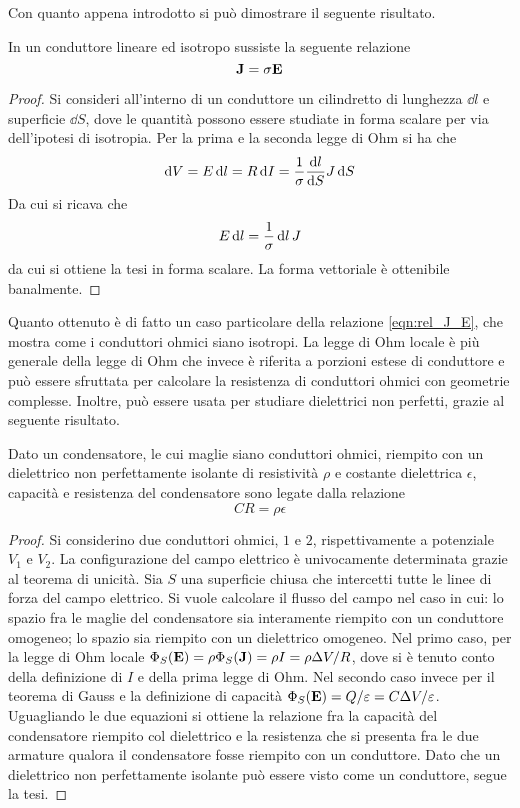 Con quanto appena introdotto si può dimostrare il seguente risultato.
\begin{thm}
    In un conduttore lineare ed isotropo sussiste la seguente relazione
    \begin{equation}
        \vb{J}=\sigma\vb{E}
    \end{equation}
\end{thm}
\begin{proof}
    Si consideri all'interno di un conduttore un cilindretto di lunghezza $\dd{l}$ e superficie $\dd{S}$,
    dove le quantità possono essere studiate in forma scalare per via dell'ipotesi di isotropia.
    Per la prima e la seconda legge di Ohm si ha che
    \[
        \dd{V}=E\dd{l}=R\dd{I}=\frac{1}{\sigma}\frac{\dd{l}}{\dd{S}}J\dd{S}
    \]
    Da cui si ricava che
    \[
        E\dd{l}=\frac{1}{\sigma}\dd{l}J
    \]
    da cui si ottiene la tesi in forma scalare. La forma vettoriale è ottenibile banalmente.
\end{proof}
Quanto ottenuto è di fatto un caso particolare della relazione \eqref{eqn:rel_J_E}, che mostra come
i conduttori ohmici siano isotropi. La legge di
Ohm locale è più generale della legge di Ohm che invece è riferita a porzioni estese di conduttore e può
essere sfruttata per calcolare la resistenza di conduttori ohmici con geometrie complesse.
Inoltre, può essere usata per studiare dielettrici non perfetti, grazie al seguente risultato.
\begin{cor}
    Dato un condensatore, le cui maglie siano conduttori ohmici, riempito con un dielettrico
    non perfettamente isolante di resistività $\rho$ e costante dielettrica $\epsilon$,
    capacità e resistenza del condensatore sono legate dalla relazione
    \[
        CR=\rho\epsilon
    \]
\end{cor}
\begin{proof}
    Si considerino due conduttori ohmici, $1$ e $2$, rispettivamente a potenziale $V_1$ e $V_2$.
    La configurazione del campo elettrico è univocamente determinata grazie al teorema di unicità.
    Sia $S$ una superficie chiusa che intercetti tutte le linee di forza del campo elettrico. Si vuole
    calcolare il flusso del campo nel caso in cui: lo spazio fra le maglie del condensatore sia interamente
    riempito con un conduttore omogeneo; lo spazio sia riempito con un dielettrico omogeneo.
    Nel primo caso, per la legge di Ohm locale $\Phi_S(\vb{E})=\rho\Phi_S(\vb{J})=\rho I=\rho\Delta V/R$,
    dove si è tenuto conto della definizione di $I$ e della prima legge di Ohm.
    Nel secondo caso invece per il teorema di Gauss e la definizione di capacità
    $\Phi_S(\vb{E})=Q/\varepsilon=C\Delta V/\varepsilon$. Uguagliando le due equazioni si ottiene la relazione
    fra la capacità del condensatore riempito col dielettrico e la resistenza che si presenta fra le due
    armature qualora il condensatore fosse riempito con un conduttore. Dato che un dielettrico non perfettamente
    isolante può essere visto come un conduttore, segue la tesi.
\end{proof}

